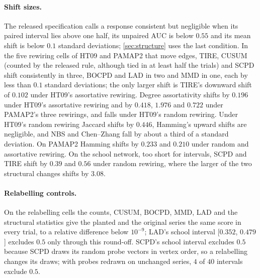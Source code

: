 \documentclass[11pt]{article}
\theoremstyle{dsplain}
\theoremstyle{definition}
\begin{document}
\paragraph{Shift sizes.} The released specification calls a response consistent but negligible when its
paired interval lies above one half, its unpaired AUC is below $0.55$ and its mean shift is below $0.1$
standard deviations; \cref{sec:structure} uses the last condition. In the five rewiring cells of HT09 and
PAMAP2 that move edges, TIRE, CUSUM (counted by the released rule, although tied in at least half the trials) and SCPD shift consistently in three, BOCPD and LAD in two and MMD in one,
each by less than $0.1$ standard deviations; the only larger shift is TIRE's downward shift of $0.102$ under HT09's assortative
rewiring. Degree assortativity shifts by $0.196$ under HT09's assortative rewiring and by $0.418$, $1.976$
and $0.722$ under PAMAP2's three rewirings, and falls under HT09's random rewiring. Under HT09's random
rewiring Jaccard shifts by $0.446$, Hamming's upward shifts are negligible, and NBS and Chen--Zhang fall by
about a third of a standard deviation. On PAMAP2 Hamming shifts by $0.233$ and $0.210$ under
random and assortative rewiring. On the school network, too short for intervals, SCPD and TIRE shift by
$0.39$ and $0.56$ under random rewiring, where the larger of the two structural changes shifts by $3.08$.

\paragraph{Relabelling controls.} On the relabelling cells the counts, CUSUM, BOCPD, MMD, LAD and the
structural statistics give the planted and the original series the same score in every trial, to a relative
difference below $10^{-9}$; LAD's school interval [$0.352$, $0.479$] excludes $0.5$ only through this
round-off. SCPD's school interval excludes $0.5$ because SCPD draws its random probe vectors in vertex order,
so a relabelling changes its draws; with probes redrawn on unchanged series, $4$ of $40$ intervals exclude
$0.5$.
\end{document}
